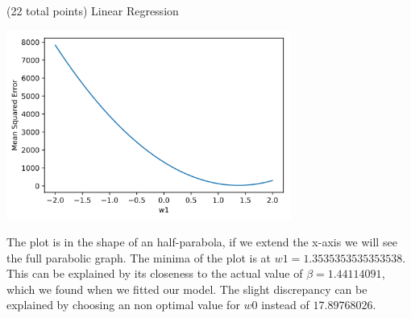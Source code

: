 \documentclass[12pt]{article}
\begin{document}
\begin{question}{(22 total points) Linear Regression}
\begin{subquestion}
\begin{answerbox}{35em}
\begin{center}
\includegraphics[width=0.7\textwidth]{results/mse-vs-ws.png}
\end{center}
The plot is in the shape of an half-parabola, if we extend the x-axis we will see the full parabolic graph. The minima of the plot is at $w1 = 1.3535353535353538$. This can be explained by its closeness to the actual value of $\beta = 1.44114091$, which we found when we fitted our model. The slight discrepancy can be explained by choosing an non optimal value for $w0$ instead of $17.89768026$.

\end{answerbox}



\end{subquestion}


 
\end{question}





\clearpage
\end{document}
